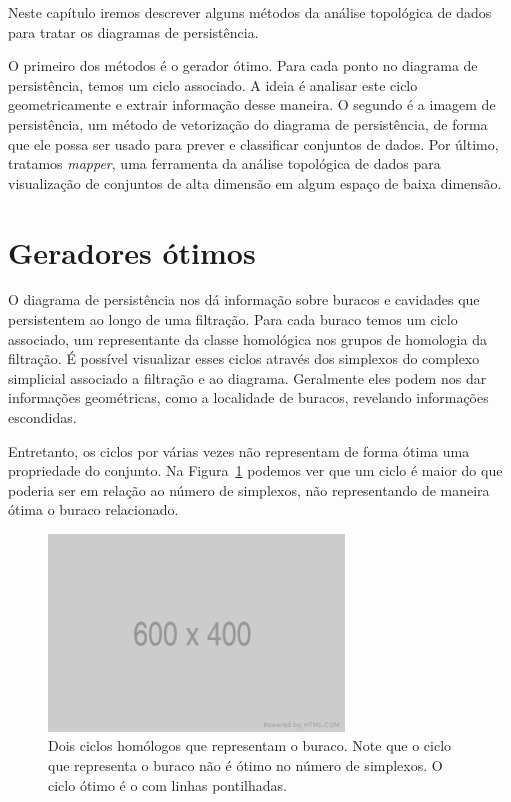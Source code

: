 Neste capítulo iremos descrever alguns métodos da análise topológica de dados
para tratar os diagramas de persistência. 

O primeiro dos métodos é o
gerador ótimo. Para cada ponto no diagrama de persistência, temos um ciclo
associado. A ideia é analisar este ciclo geometricamente e extrair 
informação desse maneira. 
O segundo é a imagem de persistência, um método de vetorização do diagrama de 
persistência, de forma que ele possa ser usado para prever e classificar 
conjuntos de dados. 
Por último, tratamos \textit{mapper}, uma ferramenta da análise topológica 
de dados para visualização de conjuntos de alta dimensão em algum 
espaço de baixa dimensão. 

\section{Geradores ótimos}
O diagrama de persistência nos dá informação sobre buracos e cavidades que
persistentem ao longo de uma filtração. Para cada buraco temos um ciclo
associado, um representante da classe homológica nos grupos de homologia 
da filtração. É possível visualizar esses ciclos através dos simplexos do
complexo simplicial associado a filtração e ao diagrama. Geralmente eles 
podem nos dar informações geométricas, como a localidade de buracos, 
revelando informações escondidas. 

Entretanto, os ciclos por várias vezes não representam de forma ótima
uma propriedade do conjunto. Na Figura~\ref{fig:nonoptcyc} podemos
ver que um ciclo é maior do que poderia ser em relação ao número
de simplexos, não representando de maneira ótima o buraco relacionado. 
\begin{figure}\label{fig:nonoptimal}
    \centering
    \includegraphics[width=0.7\textwidth]{images/placeholder.png}
    \caption{Dois ciclos homólogos que representam o buraco. Note que o ciclo
            que representa o buraco não é ótimo no número de simplexos. O ciclo
            ótimo é o com linhas pontilhadas.}
    \label{fig:nonoptcyc}
    \fautor
\end{figure} 

